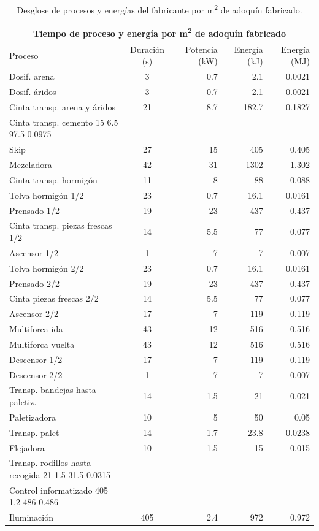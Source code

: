 \begin{table}[!htb]
\centering
\begin{tabular}{lcrrr}
\toprule
\multicolumn{5}{c}{Tiempo de proceso y energía por \si{m^2} de adoquín fabricado}\\
\midrule
Proceso & Duración (\si{s}) & Potencia (\si{kW}) & Energía (\si{kJ}) & Energía (\si{MJ})\\
\midrule
Dosif. arena & 3 & 0.7 & 2.1 & 0.0021\\
Dosif. áridos & 3 & 0.7 & 2.1 & 0.0021\\
Cinta transp. arena y áridos  & 21 & 8.7 & 182.7 & 0.1827\\
Cinta transp. cemento  15  6.5 97.5  0.0975\\
Skip  & 27 & 15 & 405 & 0.405\\
Mezcladora & 42 & 31 & 1302 & 1.302\\
Cinta transp. hormigón & 11 & 8 & 88 & 0.088\\
Tolva hormigón 1/2 & 23 & 0.7 & 16.1 & 0.0161\\
Prensado 1/2 & 19 & 23 & 437 & 0.437\\
Cinta transp. piezas frescas 1/2 & 14 & 5.5 & 77 & 0.077\\
Ascensor 1/2 & 1 & 7 & 7 & 0.007\\
Tolva hormigón 2/2 & 23 & 0.7 & 16.1 & 0.0161\\
Prensado 2/2 & 19 & 23 & 437 & 0.437\\
Cinta piezas frescas 2/2 & 14 & 5.5 & 77 & 0.077\\
Ascensor 2/2 & 17 & 7 & 119 & 0.119\\
Multiforca ida & 43 & 12 & 516 & 0.516\\
Multiforca vuelta & 43 & 12 & 516 & 0.516\\
Descensor 1/2 & 17 & 7 & 119 & 0.119\\
Descensor 2/2 & 1 & 7 & 7 & 0.007\\
Transp. bandejas hasta paletiz. & 14 & 1.5 & 21 & 0.021\\
Paletizadora & 10 & 5 & 50 & 0.05\\
Transp. palet & 14 & 1.7 & 23.8 & 0.0238\\
Flejadora & 10 & 1.5 & 15 & 0.015\\
Transp. rodillos hasta recogida  21  1.5 31.5  0.0315\\
Control informatizado 405 1.2 486 0.486\\
Iluminación & 405 & 2.4 & 972 & 0.972\\
\bottomrule
\end{tabular}
\caption{Desglose de procesos y energías del fabricante por \si{m^2} de adoquín fabricado.}
\label{desgloseenergia}
\end{table}
